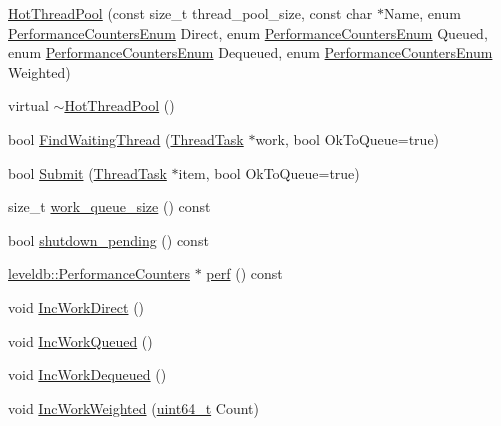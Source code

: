 \begin{DoxyCompactItemize}
\item 
\hyperlink{classleveldb_1_1_hot_thread_pool_a397962912226c11c3f471718193541b0}{Hot\+Thread\+Pool} (const size\+\_\+t thread\+\_\+pool\+\_\+size, const char $\ast$Name, enum \hyperlink{namespaceleveldb_a0ba185501d4b24cf13090cf641fc637a}{Performance\+Counters\+Enum} Direct, enum \hyperlink{namespaceleveldb_a0ba185501d4b24cf13090cf641fc637a}{Performance\+Counters\+Enum} Queued, enum \hyperlink{namespaceleveldb_a0ba185501d4b24cf13090cf641fc637a}{Performance\+Counters\+Enum} Dequeued, enum \hyperlink{namespaceleveldb_a0ba185501d4b24cf13090cf641fc637a}{Performance\+Counters\+Enum} Weighted)
\item 
virtual \hyperlink{classleveldb_1_1_hot_thread_pool_a1f944f8bcfc0036bc87c20978f00f1a1}{$\sim$\+Hot\+Thread\+Pool} ()
\item 
bool \hyperlink{classleveldb_1_1_hot_thread_pool_ae358dc103ea4873fec2ded1eb8b67eb0}{Find\+Waiting\+Thread} (\hyperlink{classleveldb_1_1_thread_task}{Thread\+Task} $\ast$work, bool Ok\+To\+Queue=true)
\item 
bool \hyperlink{classleveldb_1_1_hot_thread_pool_a8b7315ca5cfa2bcb8a11139633d17b55}{Submit} (\hyperlink{classleveldb_1_1_thread_task}{Thread\+Task} $\ast$item, bool Ok\+To\+Queue=true)
\item 
size\+\_\+t \hyperlink{classleveldb_1_1_hot_thread_pool_acc7d1479b8e81a4105b0653ca82ca95b}{work\+\_\+queue\+\_\+size} () const 
\item 
bool \hyperlink{classleveldb_1_1_hot_thread_pool_aaca48f404522caf977d56264cfc51eb8}{shutdown\+\_\+pending} () const 
\item 
\hyperlink{structleveldb_1_1_performance_counters}{leveldb\+::\+Performance\+Counters} $\ast$ \hyperlink{classleveldb_1_1_hot_thread_pool_a16063894f72b1de6c5c556a1b539022b}{perf} () const 
\item 
void \hyperlink{classleveldb_1_1_hot_thread_pool_af197444281b36da96279dacf4657bf6e}{Inc\+Work\+Direct} ()
\item 
void \hyperlink{classleveldb_1_1_hot_thread_pool_a30ca13128f7acc57db7a098345a98870}{Inc\+Work\+Queued} ()
\item 
void \hyperlink{classleveldb_1_1_hot_thread_pool_a04887fa51e30658c5bcae49161ade203}{Inc\+Work\+Dequeued} ()
\item 
void \hyperlink{classleveldb_1_1_hot_thread_pool_a329794c6b10f1a95410a8a1f8abb4d50}{Inc\+Work\+Weighted} (\hyperlink{stdint_8h_aaa5d1cd013383c889537491c3cfd9aad}{uint64\+\_\+t} Count)
\end{DoxyCompactItemize}
